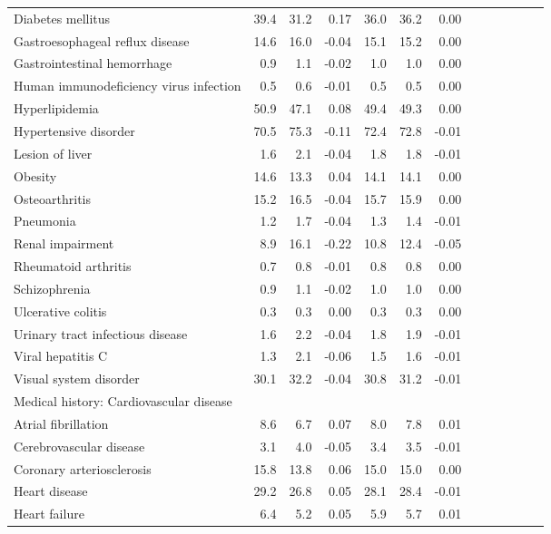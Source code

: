 \documentclass[11pt,]{article}
\begin{document}
\begin{longtable}{lrrrrrrrrrrrr}
      Diabetes mellitus & 39.4 & 31.2 &  0.17 & 36.0 & 36.2 &  0.00 \\ 
      Gastroesophageal reflux disease & 14.6 & 16.0 & -0.04 & 15.1 & 15.2 &  0.00 \\ 
      Gastrointestinal hemorrhage &  0.9 &  1.1 & -0.02 &  1.0 &  1.0 &  0.00 \\ 
      Human immunodeficiency virus infection &  0.5 &  0.6 & -0.01 &  0.5 &  0.5 &  0.00 \\ 
      Hyperlipidemia & 50.9 & 47.1 &  0.08 & 49.4 & 49.3 &  0.00 \\ 
      Hypertensive disorder & 70.5 & 75.3 & -0.11 & 72.4 & 72.8 & -0.01 \\ 
      Lesion of liver &  1.6 &  2.1 & -0.04 &  1.8 &  1.8 & -0.01 \\ 
      Obesity & 14.6 & 13.3 &  0.04 & 14.1 & 14.1 &  0.00 \\ 
      Osteoarthritis & 15.2 & 16.5 & -0.04 & 15.7 & 15.9 &  0.00 \\ 
      Pneumonia &  1.2 &  1.7 & -0.04 &  1.3 &  1.4 & -0.01 \\ 
      Renal impairment &  8.9 & 16.1 & -0.22 & 10.8 & 12.4 & -0.05 \\ 
      Rheumatoid arthritis &  0.7 &  0.8 & -0.01 &  0.8 &  0.8 &  0.00 \\ 
      Schizophrenia &  0.9 &  1.1 & -0.02 &  1.0 &  1.0 &  0.00 \\ 
      Ulcerative colitis &  0.3 &  0.3 &  0.00 &  0.3 &  0.3 &  0.00 \\ 
      Urinary tract infectious disease &  1.6 &  2.2 & -0.04 &  1.8 &  1.9 & -0.01 \\ 
      Viral hepatitis C &  1.3 &  2.1 & -0.06 &  1.5 &  1.6 & -0.01 \\ 
      Visual system disorder & 30.1 & 32.2 & -0.04 & 30.8 & 31.2 & -0.01 \\ 
  Medical history: Cardiovascular disease &    &    &     &    &    &     \\ 
      Atrial fibrillation &  8.6 &  6.7 &  0.07 &  8.0 &  7.8 &  0.01 \\ 
      Cerebrovascular disease &  3.1 &  4.0 & -0.05 &  3.4 &  3.5 & -0.01 \\ 
      Coronary arteriosclerosis & 15.8 & 13.8 &  0.06 & 15.0 & 15.0 &  0.00 \\ 
      Heart disease & 29.2 & 26.8 &  0.05 & 28.1 & 28.4 & -0.01 \\ 
      Heart failure &  6.4 &  5.2 &  0.05 &  5.9 &  5.7 &  0.01 \\ 

\end{longtable}
\end{document}
